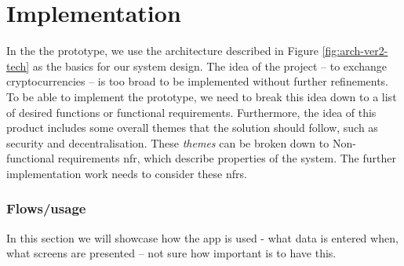 \section{Implementation}
% 
In the the prototype, we use the architecture described in Figure \ref{fig:arch-ver2-tech} as the basics for our system design. The idea of the project -- to exchange cryptocurrencies -- is too broad to be implemented without further refinements. To be able to implement the prototype, we need to break this idea down to a list of desired functions or functional requirements. Furthermore, the idea of this product includes some overall themes that the solution should follow, such as security and decentralisation. These \textit{themes} can be broken down to Non-functional requirements \acrshort{nfr}, which describe properties of the system. The further implementation work needs to consider these \acrshort{nfr}s.













\subsubsection{Flows/usage}
% 
In this section we will showcase how the app is used - what data is entered when, what screens are presented -- not sure how important is to have this.


